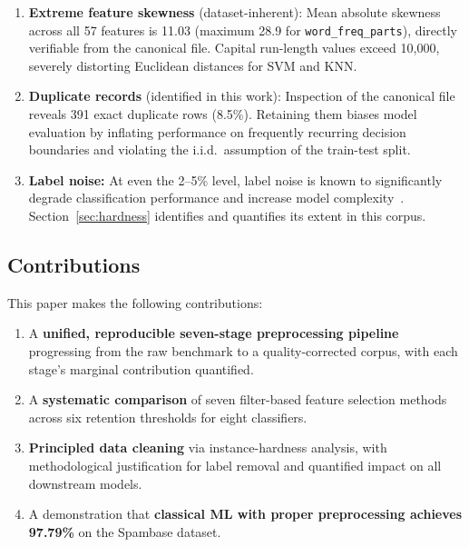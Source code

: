 \documentclass[conference]{IEEEtran}
\begin{document}
\begin{enumerate}
  \item \textbf{Extreme feature skewness} (dataset-inherent):
        Mean absolute skewness across all 57 features is 11.03
        (maximum 28.9 for \texttt{word\_freq\_parts}), directly
        verifiable from the canonical file. Capital run-length
        values exceed 10,000, severely distorting Euclidean
        distances for SVM and KNN.
  \item \textbf{Duplicate records} (identified in this work):
        Inspection of the canonical file reveals 391 exact
        duplicate rows (8.5\%). Retaining them biases model
        evaluation by inflating performance on frequently
        recurring decision boundaries and violating the i.i.d.\
        assumption of the train-test split.
  \item \textbf{Label noise:} At even the 2--5\% level, label noise is known to
        significantly degrade classification performance and increase model
        complexity~\cite{ref2}. Section~\ref{sec:hardness} identifies and
        quantifies its extent in this corpus.
\end{enumerate}

\subsection{Contributions}

This paper makes the following contributions:

\begin{enumerate}
  \item A \textbf{unified, reproducible seven-stage
        preprocessing pipeline} progressing from the raw
        benchmark to a quality-corrected corpus, with each
        stage's marginal contribution quantified.
  \item A \textbf{systematic comparison} of seven filter-based
        feature selection methods across six retention thresholds
        for eight classifiers.
  \item \textbf{Principled data cleaning} via instance-hardness
        analysis, with methodological justification for label
        removal and quantified impact on all downstream models.
  \item A demonstration that \textbf{classical ML with proper
        preprocessing achieves 97.79\%} on the Spambase dataset.
\end{enumerate}

\end{document}

